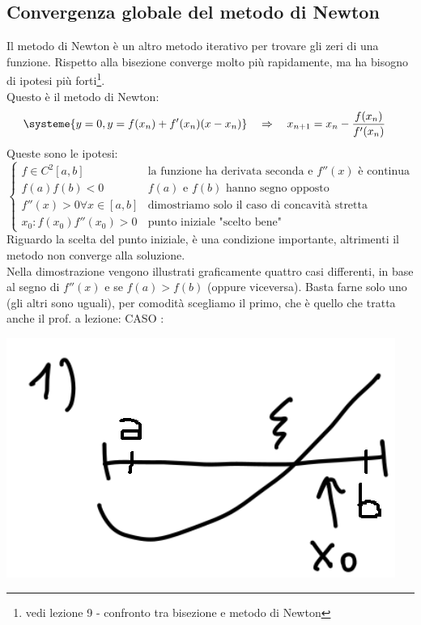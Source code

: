 \subsection{Convergenza globale del metodo di Newton}
Il metodo di Newton è un altro metodo iterativo per trovare gli zeri di una funzione. Rispetto alla bisezione converge molto più rapidamente, ma ha bisogno di ipotesi più forti\footnote[1]{vedi lezione 9 - confronto tra bisezione e metodo di Newton}.\\
Questo è il metodo di Newton:
\begin{align*}
    &\systeme{y = 0, y = f(x_n)+f'(x_n)(x-x_n)}  \quad \Rightarrow \quad x_{n+1} = x_n-\frac{f(x_n)}{f'(x_n)}
\end{align*}
Queste sono le ipotesi:
\begin{equation*}
    \begin{cases}
        f \in C^2[a,b] & \text{la funzione ha derivata seconda e } f''(x) \text{ è continua} \\
        f(a)f(b) < 0   & f(a) \text{ e } f(b) \text{ hanno segno opposto}\\
        f''(x)>0 \forall x \in [a,b] & \text {dimostriamo solo il caso di concavità stretta}\\
        x_0: f(x_0)f''(x_0)>0 & \text{punto iniziale "scelto bene"}
    \end{cases}
    \end{equation*}
Riguardo la scelta del punto iniziale, è una condizione importante, altrimenti il metodo non converge alla soluzione.\\
Nella dimostrazione vengono illustrati graficamente quattro casi differenti, in base al segno di $f''(x)$ e se $f(a)>f(b)$ (oppure viceversa). Basta farne solo uno (gli altri sono uguali), per comodità scegliamo il primo, che è quello che tratta anche il prof. a lezione:\newline
CASO :
\begin{center}
    \includegraphics[scale=0.5]{./res/img/newton1.png}
\end{center}
